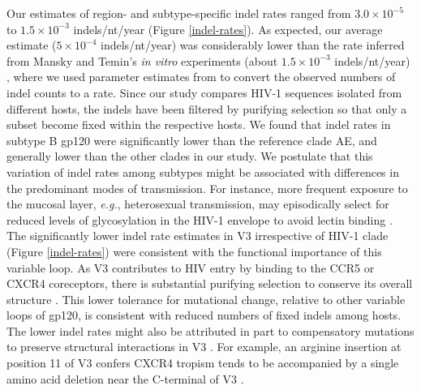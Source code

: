 \documentclass[12pt]{article}
\begin{document}
Our estimates of region- and subtype-specific indel rates ranged from $3.0\times 10^{-5}$ to $1.5\times 10^{-3}$ indels/nt/year (Figure \ref{indel-rates}). 
As expected, our average estimate ($5\times 10^{-4}$ indels/nt/year) was considerably lower than the rate inferred from Mansky and Temin's \textit{in vitro} experiments (about $1.5\times 10^{-3}$ indels/nt/year) \citep{Mansky:1995} , where we used parameter estimates from \citet{Perelson:1999} to convert the observed numbers of indel counts to a rate.
Since our study compares HIV-1 sequences isolated from different hosts, the indels have been filtered by purifying selection so that only a subset become fixed within the respective hosts.
We found that indel rates in subtype B gp120 were significantly lower than the reference clade AE, and generally lower than the other clades in our study.
We postulate that this variation of indel rates among subtypes might be associated with differences in the predominant modes of transmission.
For instance, more frequent exposure to the mucosal layer, \textit{e.g.}, heterosexual transmission, may episodically select for reduced levels of glycosylation in the HIV-1 envelope to avoid lectin binding \citep{joseph2015bottlenecks}.
The significantly lower indel rate estimates in V3 irrespective of HIV-1 clade (Figure \ref{indel-rates}) were consistent with the functional importance of this variable loop. 
As V3 contributes to HIV entry by binding to the CCR5 or CXCR4 coreceptors, there is substantial purifying selection to conserve its overall structure \citep{Liang:1999, Jiang:2010}. 
This lower tolerance for mutational change, relative to other variable loops of gp120, is consistent with reduced numbers of fixed indels among hosts. 
The lower indel rates might also be attributed in part to compensatory mutations to preserve structural interactions in V3 \citep{poon2007evolutionary}.
For example, an arginine insertion at position 11 of V3 confers CXCR4 tropism tends to be accompanied by a single amino acid deletion near the C-terminal of V3 \citep{Tsuchiya:2013}.





\end{document}
